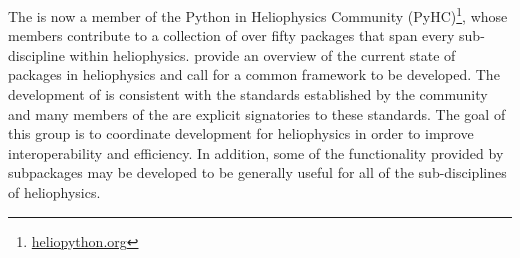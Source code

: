 The \sunpyproj is now a member of the Python in Heliophysics Community (PyHC)\footnote{\url{heliopython.org}}, whose members contribute to a collection of over fifty \python packages that span every sub-discipline within heliophysics.
\citet{snakes} provide an overview of the current state of \python packages in heliophysics and call for a common framework to be developed.
The development of \sunpypkg is consistent with the standards established by the community \citep{pyhcStandards} and many members of the \sunpyproj are explicit signatories to these standards.
The goal of this group is to coordinate \python development for heliophysics in order to improve interoperability and efficiency.
In addition, some of the functionality provided by \sunpypkg subpackages may be developed to be generally useful for all of the sub-disciplines of heliophysics.
